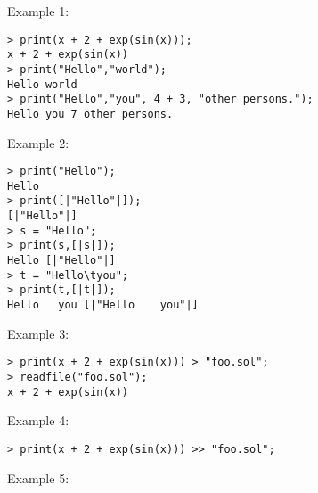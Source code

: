 \noindent Example 1: 
\begin{center}\begin{minipage}{14.8cm}\begin{Verbatim}[frame=single]
> print(x + 2 + exp(sin(x))); 
x + 2 + exp(sin(x))
> print("Hello","world");
Hello world
> print("Hello","you", 4 + 3, "other persons.");
Hello you 7 other persons.
\end{Verbatim}
\end{minipage}\end{center}
\noindent Example 2: 
\begin{center}\begin{minipage}{14.8cm}\begin{Verbatim}[frame=single]
> print("Hello");
Hello
> print([|"Hello"|]);
[|"Hello"|]
> s = "Hello";
> print(s,[|s|]);
Hello [|"Hello"|]
> t = "Hello\tyou";
> print(t,[|t|]);
Hello	you [|"Hello	you"|]
\end{Verbatim}
\end{minipage}\end{center}
\noindent Example 3: 
\begin{center}\begin{minipage}{14.8cm}\begin{Verbatim}[frame=single]
> print(x + 2 + exp(sin(x))) > "foo.sol";
> readfile("foo.sol");
x + 2 + exp(sin(x))

\end{Verbatim}
\end{minipage}\end{center}
\noindent Example 4: 
\begin{center}\begin{minipage}{14.8cm}\begin{Verbatim}[frame=single]
> print(x + 2 + exp(sin(x))) >> "foo.sol";
\end{Verbatim}
\end{minipage}\end{center}
\noindent Example 5: 
